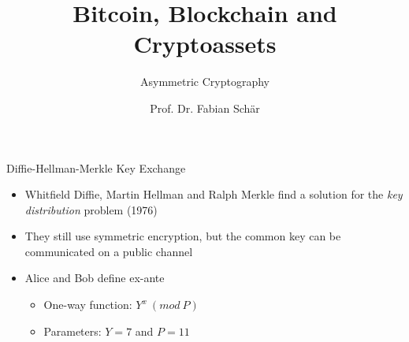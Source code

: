 \documentclass[handout]{beamer}
\title{Bitcoin, Blockchain and Cryptoassets}
\subtitle{Asymmetric Cryptography}
\author{Prof. Dr. Fabian Schär}
\institute{University of Basel}
\begin{document}
\thispagestyle{empty}
\begin{frame}[noframenumbering]
	\titlepage
\end{frame}

\begin{frame}{Diffie-Hellman-Merkle Key Exchange}
	\begin{itemize}
		\item<1-> Whitfield Diffie, Martin Hellman and Ralph Merkle find a solution for the \textit{key distribution} problem (1976)
		\item<2-> They still use symmetric encryption, but the common key can be communicated on a public channel
		\vspace{0.5cm}
		\item<3-> Alice and Bob define ex-ante
		\begin{itemize}
			\item<4-> One-way function: \(Y^x\ (mod\ P)\)
			\item<5-> Parameters: \(Y = 7\) and \(P = 11\)
		\end{itemize}
	\end{itemize}
\end{frame}
\end{document}

